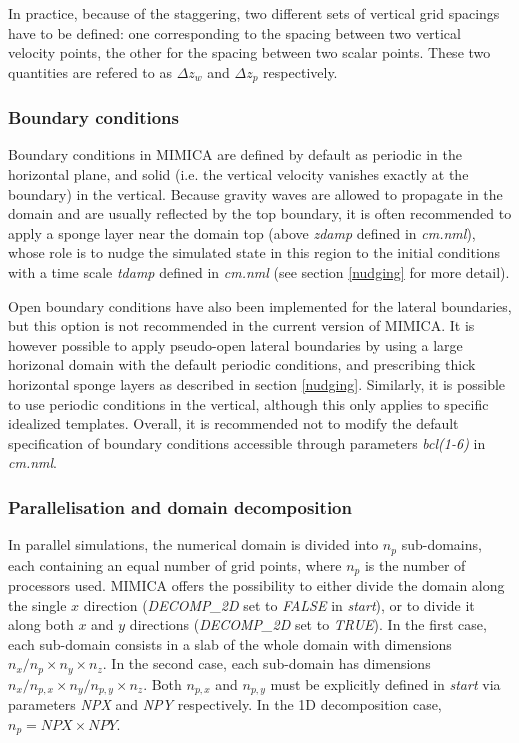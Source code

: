 \documentclass[12pt,A4,french]{article}
\begin{document}
In practice, because of the staggering, two different sets of vertical grid spacings have to be defined: one corresponding to the spacing between two vertical velocity points, the other for the spacing between two scalar points. These two quantities are refered to as $\Delta z_{w}$ and $\Delta z_{p}$ respectively.

\subsubsection{Boundary conditions}

Boundary conditions in MIMICA are defined by default as periodic in the horizontal plane, and solid (i.e. the vertical velocity vanishes exactly at the boundary) in the vertical. Because gravity waves are allowed to propagate in the domain and are usually reflected by the top boundary, it is often recommended to apply a sponge layer near the domain top (above {\it zdamp} defined in {\it cm.nml}), whose role is to nudge the simulated state in this region to the initial conditions with a time scale {\it tdamp} defined in {\it cm.nml} (see section \ref{nudging} for more detail).

Open boundary conditions have also been implemented for the lateral boundaries, but this option is not recommended in the current version of MIMICA. It is however possible to apply pseudo-open lateral boundaries by using a large horizonal domain with the default periodic conditions, and prescribing thick horizontal sponge layers as described in section \ref{nudging}. Similarly, it is possible to use periodic conditions in the vertical, although this only applies to specific idealized templates. Overall, it is recommended not to modify the default specification of boundary conditions accessible through parameters {\it bcl(1-6)} in {\it cm.nml}.

\subsubsection{Parallelisation and domain decomposition}
\label{decomposition}

In parallel simulations, the numerical domain is divided into $n_p$ sub-domains, each containing an equal number of grid points, where $n_p$ is the number of processors used. MIMICA offers the possibility to either divide the domain along the single $x$ direction ({\it DECOMP\_2D} set to {\it FALSE} in {\it start}), or to divide it along both $x$ and $y$ directions ({\it DECOMP\_2D} set to {\it TRUE}). In the first case, each sub-domain consists in a slab of the whole domain with dimensions $n_x/n_p \times n_y \times n_z$. In the second case, each sub-domain has dimensions $n_x/n_{p,x} \times n_y/n_{p,y} \times n_z$. Both $n_{p,x}$ and $n_{p,y}$ must be explicitly defined in {\it start} via parameters {\it NPX} and {\it NPY} respectively. In the 1D decomposition case, $n_p = NPX \times NPY$. 
\end{document}
